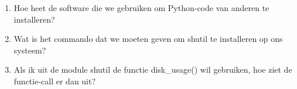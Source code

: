 \begin{enumerate}
\item Hoe heet de software die we gebruiken om Python-code van anderen te installeren?
\item Wat is het commando dat we moeten geven om shutil te installeren op ons systeem?
\item Als ik uit de module shutil de functie disk\_usage() wil gebruiken, hoe ziet de functie-call er dan uit?
\end{enumerate}
